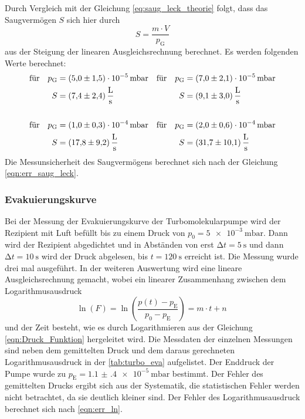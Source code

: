     \noindent Durch Vergleich mit der Gleichung \eqref{eq:saug_leck_theorie} folgt, dass das Saugvermögen $S$ sich hier durch
    \begin{equation*}
      S = \frac{m \cdot V}{p_\text{G}}
    \end{equation*}
    aus der Steigung der linearen Ausgleichsrechnung berechnet. Es werden folgenden Werte berechnet:
    \begin{align*}
      \text{für} \quad p_\text{G} &= \SI{5.0(15)e-5}{\milli\bar}   & \text{für} \quad p_\text{G} &= \SI{7.0(21)e-5}{\milli\bar} \\
      S &= \SI{7.4 \pm 2.4}{\litre\per\second}                 & S &= \SI{9.1 \pm 3.0}{\litre\per\second}  \\
      \\
      \text{für} \quad p_\text{G} &= \SI{1.0(3)e-4}{\milli\bar}  & \text{für} \quad p_\text{G} &= \SI{2.0(6)e-4}{\milli\bar} \\
      S &= \SI{17.8 \pm 9.2}{\litre\per\second}                & S &= \SI{31.7 \pm 10.1}{\litre\per\second}  
    \end{align*}
    Die Messunsicherheit des Saugvermögens berechnet sich nach der Gleichung \eqref{eqn:err_saug_leck}.

  \subsubsection{Evakuierungskurve}

    \noindent Bei der Messung der Evakuierungskurve der Turbomolekularpumpe wird der Rezipient mit Luft befüllt bis zu einem Druck von $p_0 = \SI{5e-3}{\milli\bar}$. Dann wird der Rezipient 
    abgedichtet und in Abständen von erst $\increment t = \SI{5}{\second}$ und dann $\increment t = \SI{10}{\second}$ wird der Druck abgelesen, bis $ t = \SI{120}{\second}$ erreicht ist. Die Messung wurde drei mal ausgeführt.
    In der weiteren Auswertung wird eine lineare Ausgleichsrechnung gemacht, wobei ein linearer Zusammenhang zwischen dem Logarithmusausdruck 
    \begin{equation*}
      \ln(F) = \ln \left( \frac{p(t) - p_\text{E}}{p_0 - p_\text{E}}\right) = m \cdot t + n \, 
    \end{equation*} 
    und der Zeit besteht, wie es durch Logarithmieren aus der Gleichung \eqref{eqn:Druck_Funktion} hergeleitet wird. Die Messdaten der einzelnen Messungen sind neben dem gemittelten Druck und dem daraus gerechneten Logarithmusausdruck in der \autoref{tab:turbo_eva} aufgelistet. 
    Der Enddruck der Pumpe wurde zu $p_\text{E} = \SI{1.1(4)e-5}{\milli\bar}$ bestimmt. Der Fehler des gemittelten Drucks ergibt sich aus der Systematik, die statistischen Fehler werden nicht betrachtet, da sie deutlich kleiner sind.
    Der Fehler des Logarithmusausdruck berechnet sich nach \eqref{eqn:err_ln}. 
  

